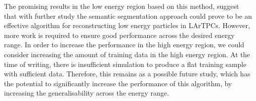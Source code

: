 The promising results in the low energy region based on this method, suggest
that with further study the semantic segmentation approach could prove to be an
effective algorithm for reconstructing low energy particles in LArTPCs. However,
more work is required to ensure good performance across the desired energy
range. In order to increase the performance in the high energy region, we could
consider increasing the amount of training data in the high energy region. At
the time of writing, there is insufficient \protodune{} simulation to produce 
a flat training sample with sufficient data. Therefore, this remains as a 
possible future study, which has the potential to significantly increase the
performance of this algorithm, by increasing the generalisability across the
energy range.
